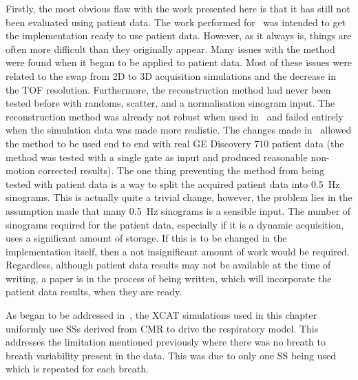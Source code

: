         Firstly, the most obvious flaw with the work presented here is that it has still not been evaluated using patient data. The work performed for~ was intended to get the implementation ready to use patient data. However, as it always is, things are often more difficult than they originally appear. Many issues with the method were found when it began to be applied to patient data. Most of these issues were related to the swap from \gls{2D} to \gls{3D} acquisition simulations and the decrease in the \gls{TOF} resolution. Furthermore, the reconstruction method had never been tested before with randoms, scatter, and a normalisation sinogram input. The reconstruction method was already not robust when used in~ and failed entirely when the simulation data was made more realistic. The changes made in~ allowed the method to be used end to end with real \gls{GE} Discovery $710$ patient data (the method was tested with a single gate as input and produced reasonable non-motion corrected results). The one thing preventing the method from being tested with patient data is a way to split the acquired patient data into \SI{0.5}{\hertz} sinograms. This is actually quite a trivial change, however, the problem lies in the assumption made that many \SI{0.5}{\hertz} sinograms is a sensible input. The number of sinograms required for the patient data, especially if it is a dynamic acquisition, uses a significant amount of storage. If this is to be changed in the implementation itself, then a not insignificant amount of work would be required. Regardless, although patient data results may not be available at the time of writing, a paper is in the process of being written, which will incorporate the patient data results, when they are ready.

        As began to be addressed in~, the \gls{XCAT} simulations used in this chapter uniformly use \glspl{SS} derived from \gls{CMR} to drive the respiratory model. This addresses the limitation mentioned previously where there was no breath to breath variability present in the data. This was due to only one \gls{SS} being used which is repeated for each breath.

